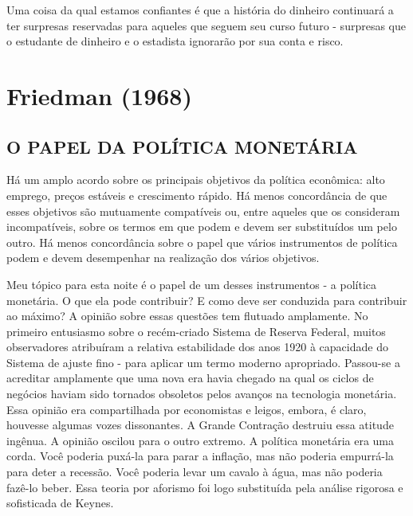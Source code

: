 \documentclass[a4paper,12pt]{article}[abntex2]
\begin{document}
Uma coisa da qual estamos confiantes é que a história do dinheiro continuará a ter surpresas reservadas para aqueles que seguem seu curso futuro - surpresas que o estudante de dinheiro e o estadista ignorarão por sua conta e risco.

\section{\textbf{Friedman (1968)}}
\subsection{\textbf{O PAPEL DA POLÍTICA MONETÁRIA}}

Há um amplo acordo sobre os principais objetivos da política econômica: alto emprego, preços estáveis e crescimento rápido. Há menos concordância de que esses objetivos são mutuamente compatíveis ou, entre aqueles que os consideram incompatíveis, sobre os termos em que podem e devem ser substituídos um pelo outro. Há menos concordância sobre o papel que vários instrumentos de política podem e devem desempenhar na realização dos vários objetivos.

Meu tópico para esta noite é o papel de um desses instrumentos - a política monetária. O que ela pode contribuir? E como deve ser conduzida para contribuir ao máximo? A opinião sobre essas questões tem flutuado amplamente. No primeiro entusiasmo sobre o recém-criado Sistema de Reserva Federal, muitos observadores atribuíram a relativa estabilidade dos anos 1920 à capacidade do Sistema de ajuste fino - para aplicar um termo moderno apropriado. Passou-se a acreditar amplamente que uma nova era havia chegado na qual os ciclos de negócios haviam sido tornados obsoletos pelos avanços na tecnologia monetária. Essa opinião era compartilhada por economistas e leigos, embora, é claro, houvesse algumas vozes dissonantes. A Grande Contração destruiu essa atitude ingênua. A opinião oscilou para o outro extremo. A política monetária era uma corda. Você poderia puxá-la para parar a inflação, mas não poderia empurrá-la para deter a recessão. Você poderia levar um cavalo à água, mas não poderia fazê-lo beber. Essa teoria por aforismo foi logo substituída pela análise rigorosa e sofisticada de Keynes.
\end{document}

